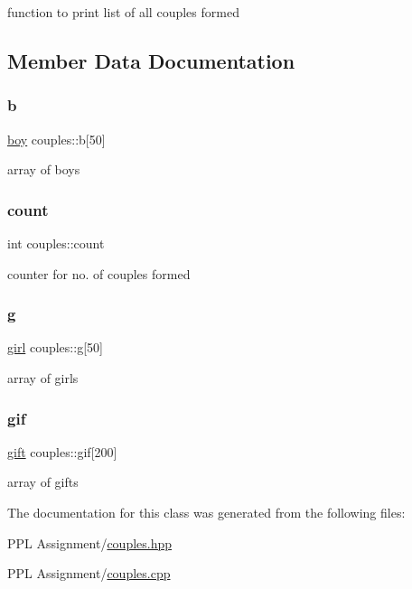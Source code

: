 function to print list of all couples formed 

\subsection{Member Data Documentation}
\mbox{\label{classcouples_a467d08e9148858f552b8bfd1655ac888}} 
\subsubsection{\texorpdfstring{b}{b}}
{\footnotesize\ttfamily \hyperlink{classboy}{boy} couples\+::b\mbox{[}50\mbox{]}}

array of boys \mbox{\label{classcouples_aa154166f508ecfb93efdd1fb7516ef20}} 
\subsubsection{\texorpdfstring{count}{count}}
{\footnotesize\ttfamily int couples\+::count}

counter for no. of couples formed \mbox{\label{classcouples_a4e5a2e8a3321a07c295dd488182d5ae1}} 
\subsubsection{\texorpdfstring{g}{g}}
{\footnotesize\ttfamily \hyperlink{classgirl}{girl} couples\+::g\mbox{[}50\mbox{]}}

array of girls \mbox{\label{classcouples_a33c59b4e2c22609d7d47c467b4434bb1}} 
\subsubsection{\texorpdfstring{gif}{gif}}
{\footnotesize\ttfamily \hyperlink{classgift}{gift} couples\+::gif\mbox{[}200\mbox{]}}

array of gifts 

The documentation for this class was generated from the following files\+:\begin{DoxyCompactItemize}
\item 
P\+P\+L Assignment/\hyperlink{couples_8hpp}{couples.\+hpp}\item 
P\+P\+L Assignment/\hyperlink{couples_8cpp}{couples.\+cpp}\end{DoxyCompactItemize}
